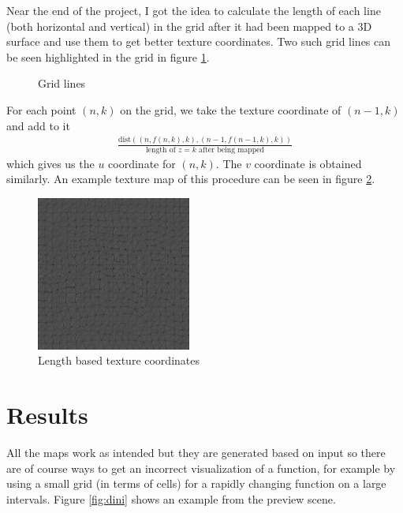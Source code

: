 \documentclass{acmsiggraph}
\begin{document}
Near the end of the project, I got the idea to calculate the length of each line (both horizontal and vertical) in the grid after it had been mapped to a 3D surface and use them to get better texture coordinates. Two such grid lines can be seen highlighted in the grid in figure \ref{fig:glines}. 
\begin{figure}[ht]
  \centering
  \caption{Grid lines}
  \label{fig:glines}
\end{figure}
For each point $(n,k)$ on the grid, we take the texture coordinate of $(n-1,k)$ and add to it 
\begin{align*}
\frac{\text{dist}((n,f(n,k),k),(n-1,f(n-1,k),k))}{\text{length of $z=k$ after being mapped}}
\end{align*}
which gives us the $u$ coordinate for $(n,k)$. The $v$ coordinate is obtained similarly. An example texture map of this procedure can be seen in figure \ref{fig:uvmap}.

\begin{figure}[ht]
  \centering
   \includegraphics[width=2in]{images/uvmap.png}
  \caption{Length based texture coordinates}
  \label{fig:uvmap}
\end{figure}

\section{Results}
All the maps work as intended but they are generated based on input so there are of course ways to get an
incorrect visualization of a function, for example by using a small grid (in terms of cells) for a rapidly changing function on a large intervals. Figure \ref{fig:dini} shows an example from the preview scene.
\end{document}
